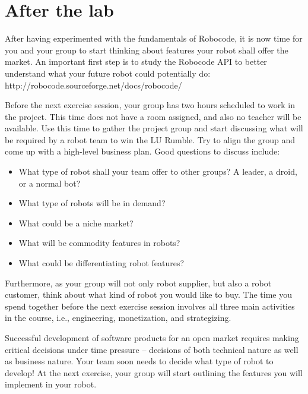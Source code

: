 \documentclass{scrreprt}
\begin{document}
\chapter{After the lab}
After having experimented with the fundamentals of Robocode, it is now time for you and your group to start thinking about features your robot shall offer the market. An important first step is to study the Robocode API to better understand what your future robot could potentially do: http://robocode.sourceforge.net/docs/robocode/

Before the next exercise session, your group has two hours scheduled to work in the project. This time does not have a room assigned, and also no teacher will be available. Use this time to gather the project group and start discussing what will be required by a robot team to win the LU Rumble. Try to align the group and come up with a high-level business plan. Good questions to discuss include:
\begin{itemize}
\item What type of robot shall your team offer to other groups? A leader, a droid, or a normal bot?
\item What type of robots will be in demand?
\item What could be a niche market?
\item What will be commodity features in robots?
\item What could be differentiating robot features?
\end{itemize}

Furthermore, as your group will not only robot supplier, but also a robot customer, think about what kind of robot you would like to buy. The time you spend together before the next exercise session involves all three main activities in the course, i.e., engineering, monetization, and strategizing.  

Successful development of software products for an open market requires making critical decisions under time pressure -- decisions of both technical nature as well as business nature. Your team soon needs to decide what type of robot to develop! At the next exercise, your group will start outlining the features you will implement in your robot.
\end{document}
